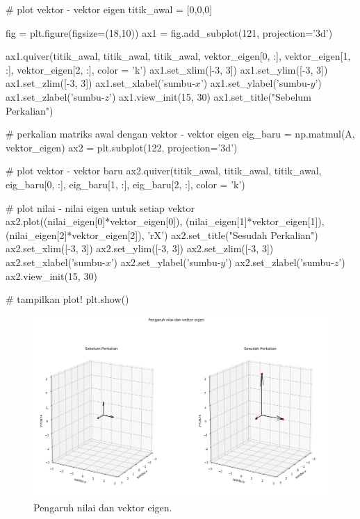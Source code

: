 \begin{pyin}
# plot vektor - vektor eigen
titik_awal = [0,0,0]

fig = plt.figure(figsize=(18,10))
ax1 = fig.add_subplot(121, projection='3d')

ax1.quiver(titik_awal, titik_awal, titik_awal, vektor_eigen[0, :], vektor_eigen[1, :], vektor_eigen[2, :], color = 'k')
ax1.set_xlim([-3, 3])
ax1.set_ylim([-3, 3])
ax1.set_zlim([-3, 3])
ax1.set_xlabel('sumbu-$x$')
ax1.set_ylabel('sumbu-$y$')
ax1.set_zlabel('sumbu-$z$')
ax1.view_init(15, 30)
ax1.set_title("Sebelum Perkalian")

# perkalian matriks awal dengan vektor - vektor eigen
eig_baru = np.matmul(A, vektor_eigen)
ax2 = plt.subplot(122, projection='3d')

# plot vektor - vektor baru
ax2.quiver(titik_awal, titik_awal, titik_awal, eig_baru[0, :], eig_baru[1, :], eig_baru[2, :], color = 'k')

# plot nilai - nilai eigen untuk setiap vektor 
ax2.plot((nilai_eigen[0]*vektor_eigen[0]), (nilai_eigen[1]*vektor_eigen[1]), (nilai_eigen[2]*vektor_eigen[2]), 'rX')
ax2.set_title("Sesudah Perkalian")
ax2.set_xlim([-3, 3])
ax2.set_ylim([-3, 3])
ax2.set_zlim([-3, 3])
ax2.set_xlabel('sumbu-$x$')
ax2.set_ylabel('sumbu-$y$')
ax2.set_zlabel('sumbu-$z$')
ax2.view_init(15, 30)

# tampilkan plot!
plt.show()
\end{pyin}

\begin{figure}[H]
    \centering
    \includegraphics[width=1\textwidth]{gambar/gmb3.png}
    \caption{Pengaruh nilai dan vektor eigen.}
    \label{fig:fig3}
\end{figure}
